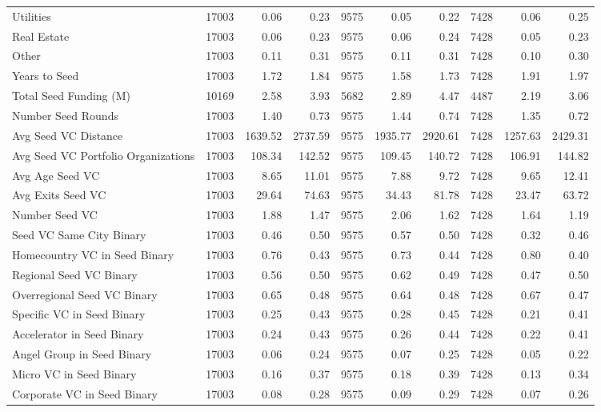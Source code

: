 {\begin{table}[!h]
{\begin{tabular}[t]{lrrrrrrrrr}
Utilities & 17003 & 0.06 & 0.23 & 9575 & 0.05 & 0.22 & 7428 & 0.06 & 0.25\\
Real Estate & 17003 & 0.06 & 0.23 & 9575 & 0.06 & 0.24 & 7428 & 0.05 & 0.23\\
Other & 17003 & 0.11 & 0.31 & 9575 & 0.11 & 0.31 & 7428 & 0.10 & 0.30\\
Years to Seed & 17003 & 1.72 & 1.84 & 9575 & 1.58 & 1.73 & 7428 & 1.91 & 1.97\\
\addlinespace
Total Seed Funding (M) & 10169 & 2.58 & 3.93 & 5682 & 2.89 & 4.47 & 4487 & 2.19 & 3.06\\
Number Seed Rounds & 17003 & 1.40 & 0.73 & 9575 & 1.44 & 0.74 & 7428 & 1.35 & 0.72\\
Avg Seed VC Distance & 17003 & 1639.52 & 2737.59 & 9575 & 1935.77 & 2920.61 & 7428 & 1257.63 & 2429.31\\
Avg Seed VC Portfolio Organizations & 17003 & 108.34 & 142.52 & 9575 & 109.45 & 140.72 & 7428 & 106.91 & 144.82\\
Avg Age Seed VC & 17003 & 8.65 & 11.01 & 9575 & 7.88 & 9.72 & 7428 & 9.65 & 12.41\\
\addlinespace
Avg Exits Seed VC & 17003 & 29.64 & 74.63 & 9575 & 34.43 & 81.78 & 7428 & 23.47 & 63.72\\
Number Seed VC & 17003 & 1.88 & 1.47 & 9575 & 2.06 & 1.62 & 7428 & 1.64 & 1.19\\
Seed VC Same City Binary & 17003 & 0.46 & 0.50 & 9575 & 0.57 & 0.50 & 7428 & 0.32 & 0.46\\
Homecountry VC in Seed Binary & 17003 & 0.76 & 0.43 & 9575 & 0.73 & 0.44 & 7428 & 0.80 & 0.40\\
Regional Seed VC Binary & 17003 & 0.56 & 0.50 & 9575 & 0.62 & 0.49 & 7428 & 0.47 & 0.50\\
\addlinespace
Overregional Seed VC Binary & 17003 & 0.65 & 0.48 & 9575 & 0.64 & 0.48 & 7428 & 0.67 & 0.47\\
Specific VC in Seed Binary & 17003 & 0.25 & 0.43 & 9575 & 0.28 & 0.45 & 7428 & 0.21 & 0.41\\
Accelerator in Seed Binary & 17003 & 0.24 & 0.43 & 9575 & 0.26 & 0.44 & 7428 & 0.22 & 0.41\\
Angel Group in Seed Binary & 17003 & 0.06 & 0.24 & 9575 & 0.07 & 0.25 & 7428 & 0.05 & 0.22\\
Micro VC in Seed Binary & 17003 & 0.16 & 0.37 & 9575 & 0.18 & 0.39 & 7428 & 0.13 & 0.34\\
\addlinespace
Corporate VC in Seed Binary & 17003 & 0.08 & 0.28 & 9575 & 0.09 & 0.29 & 7428 & 0.07 & 0.26\\

\end{tabular}}
\end{table}}
